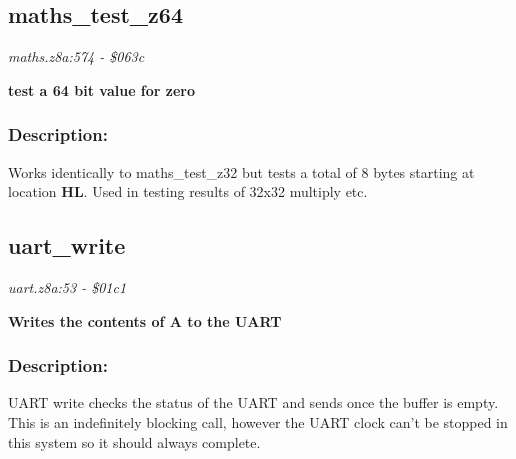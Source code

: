 \subsection{maths\_test\_z64}
\textit{maths.z8a:574 - \$063c}

\noindent
\textbf{test a 64 bit value for zero}

\subsubsection{Description:}
 Works identically to maths\_test\_z32 but tests a total of 8 bytes starting at location \textbf{HL}.  Used in testing results of 32x32 multiply etc.

\subsection{uart\_write}
\textit{uart.z8a:53 - \$01c1}

\noindent
\textbf{Writes the contents of A to the UART}

\subsubsection{Description:}
 UART write checks the status of the UART and sends once the buffer is empty. This is an indefinitely blocking call, however the UART clock can't be stopped in this system so it should always complete.

